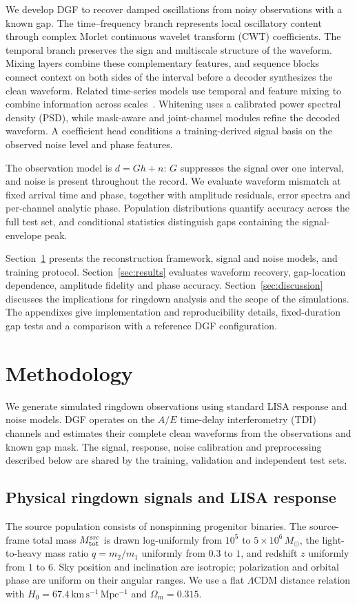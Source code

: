 \documentclass[10pt,prd,aps,a4paper,twocolumn,superscriptaddress,nofootinbib,floatfix]{revtex4-2}
\begin{document}
We develop DGF to recover damped oscillations from noisy observations with a known gap. The time--frequency branch represents local oscillatory content through complex Morlet continuous wavelet transform (CWT) coefficients. The temporal branch preserves the sign and multiscale structure of the waveform. Mixing layers combine these complementary features, and sequence blocks connect context on both sides of the interval before a decoder synthesizes the clean waveform. Related time-series models use temporal and feature mixing to combine information across scales~\cite{TSMixer2023,TimeMixer2024}. Whitening uses a calibrated power spectral density (PSD), while mask-aware and joint-channel modules refine the decoded waveform. A coefficient head conditions a training-derived signal basis on the observed noise level and phase features.

The observation model is $d=Gh+n$: $G$ suppresses the signal over one interval, and noise is present throughout the record. We evaluate waveform mismatch at fixed arrival time and phase, together with amplitude residuals, error spectra and per-channel analytic phase. Population distributions quantify accuracy across the full test set, and conditional statistics distinguish gaps containing the signal-envelope peak.

Section~\ref{sec:method} presents the reconstruction framework, signal and noise models, and training protocol. Section~\ref{sec:results} evaluates waveform recovery, gap-location dependence, amplitude fidelity and phase accuracy. Section~\ref{sec:discussion} discusses the implications for ringdown analysis and the scope of the simulations. The appendixes give implementation and reproducibility details, fixed-duration gap tests and a comparison with a reference DGF configuration.

\section{Methodology}\label{sec:method}
We generate simulated ringdown observations using standard LISA response and noise models. DGF operates on the $A/E$ time-delay interferometry (TDI) channels and estimates their complete clean waveforms from the observations and known gap mask. The signal, response, noise calibration and preprocessing described below are shared by the training, validation and independent test sets.

\subsection{Physical ringdown signals and LISA response}\label{sec:physical_signals}
The source population consists of nonspinning progenitor binaries. The source-frame total mass $M_{\rm tot}^{\rm src}$ is drawn log-uniformly from $10^5$ to $5\times10^6\,M_\odot$, the light-to-heavy mass ratio $q=m_2/m_1$ uniformly from $0.3$ to $1$, and redshift $z$ uniformly from $1$ to $6$. Sky position and inclination are isotropic; polarization and orbital phase are uniform on their angular ranges. We use a flat $\Lambda$CDM distance relation with $H_0=67.4\,\mathrm{km\,s^{-1}\,Mpc^{-1}}$ and $\Omega_m=0.315$.
\end{document}
